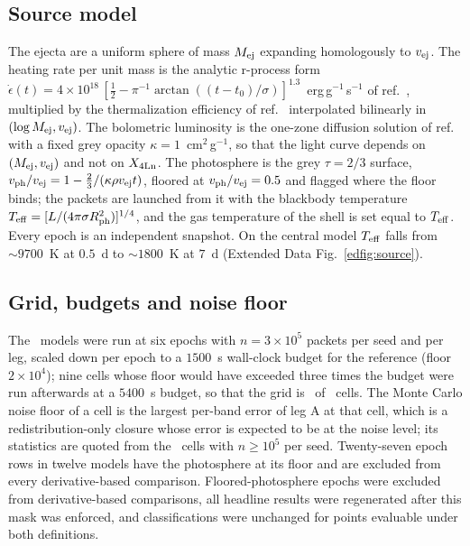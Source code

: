 \documentclass[11pt]{article}
\newcommand{\Aleg}{A\xspace}
\newcommand{\Xlan}{X_{\rm 4Ln}}
\newcommand{\Mej}{M_{\rm ej}}
\newcommand{\vej}{v_{\rm ej}}
\newcommand{\Teff}{T_{\rm eff}}
\begin{document}
\subsection*{Source model}
The ejecta are a uniform sphere of mass $\Mej$ expanding homologously to $\vej$. The heating rate per unit mass is the analytic r-process form $\dot\epsilon(t)=4\times10^{18}\,[\tfrac12-\pi^{-1}\arctan((t-t_0)/\sigma)]^{1.3}$~erg\,g$^{-1}$\,s$^{-1}$ of ref.~\cite{korobkin2012}, multiplied by the thermalization efficiency of ref.~\cite{barnes2016} interpolated bilinearly in $(\log\Mej,\vej)$. The bolometric luminosity is the one-zone diffusion solution of ref.~\cite{arnett1982} with a fixed grey opacity $\kappa=1$~cm$^2$\,g$^{-1}$, so that the light curve depends on $(\Mej,\vej)$ and not on $\Xlan$. The photosphere is the grey $\tau=2/3$ surface, $v_{\rm ph}/\vej = 1-\tfrac{2}{3}/(\kappa\rho\vej t)$, floored at $v_{\rm ph}/\vej=0.5$ and flagged where the floor binds; the packets are launched from it with the blackbody temperature $\Teff=[L/(4\pi\sigma R_{\rm ph}^2)]^{1/4}$, and the gas temperature of the shell is set equal to $\Teff$. Every epoch is an independent snapshot. On the central model $\Teff$ falls from $\sim9700$~K at $0.5$~d to $\sim1800$~K at $7$~d (Extended Data Fig.~\ref{edfig:source}).  %

\subsection*{Grid, budgets and noise floor}
The \nModels\ models were run at six epochs with $n=3\times10^5$ packets per seed and per leg, scaled down per epoch to a $1500$~s wall-clock budget for the reference (floor $2\times10^4$); nine cells whose floor would have exceeded three times the budget were run afterwards at a $5400$~s budget, so that the grid is \nCellsRan\ of \nCells\ cells. The Monte Carlo noise floor of a cell is the largest per-band error of leg \Aleg at that cell, which is a redistribution-only closure whose error is expected to be at the noise level; its statistics are quoted from the \FloorNWell\ cells with $n\ge10^5$ per seed. Twenty-seven epoch rows in twelve models have the photosphere at its floor and are excluded from every derivative-based comparison. Floored-photosphere epochs were excluded from derivative-based comparisons, all headline results were regenerated after this mask was enforced, and classifications were unchanged for points evaluable under both definitions.
\end{document}
